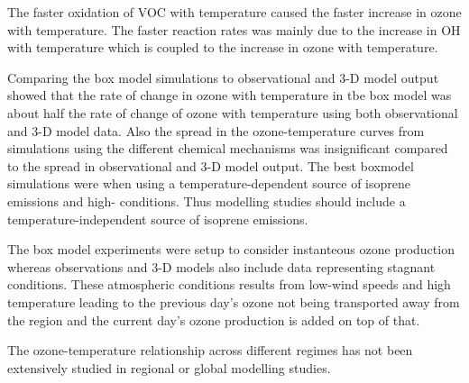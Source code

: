 The faster oxidation of VOC with temperature caused the faster increase in ozone with temperature.
The faster reaction rates was mainly due to the increase in OH with temperature which is coupled to the increase in ozone with temperature.

Comparing the box model simulations to observational and 3-D model output showed that the rate of change in ozone with temperature in tbe box model was about half the rate of change of ozone with temperature using both observational and 3-D model data.
Also the spread in the ozone-temperature curves from simulations using the different chemical mechanisms was insignificant compared to the spread in observational and 3-D model output.
The best boxmodel simulations were when using a temperature-dependent source of isoprene emissions and high- conditions.
Thus modelling studies should include a temperature-independent source of isoprene emissions.

The box model experiments were setup to consider instanteous ozone production whereas observations and 3-D models also include data representing stagnant conditions.
These atmospheric conditions results from low-wind speeds and high temperature leading to the previous day's ozone not being transported away from the region and the current day's ozone production is added on top of that.

The ozone-temperature relationship across different  regimes has not been extensively studied in regional or global modelling studies.
